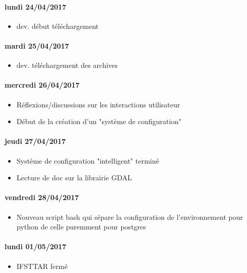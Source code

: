 \paragraph{lundi 24/04/2017}
\begin{itemize}
  \item dev. début téléchargement
\end{itemize}

\paragraph{mardi 25/04/2017}
\begin{itemize}
  \item dev. téléchargement des archives
\end{itemize}

\paragraph{mercredi 26/04/2017}
\begin{itemize}
  \item Réflexions/discussions sur les interactions utilisateur
  \item Début de la création d'un "système de configuration"
\end{itemize}

\paragraph{jeudi 27/04/2017}
\begin{itemize}
  \item Système de configuration "intelligent" terminé
  \item Lecture de doc sur la librairie GDAL
\end{itemize}

\paragraph{vendredi 28/04/2017}
\begin{itemize}
  \item Nouveau script bash qui sépare la configuration de l'environnement pour python de celle puremment pour postgres
\end{itemize}

\paragraph{lundi 01/05/2017}
\begin{itemize}
  \item IFSTTAR fermé
\end{itemize}

